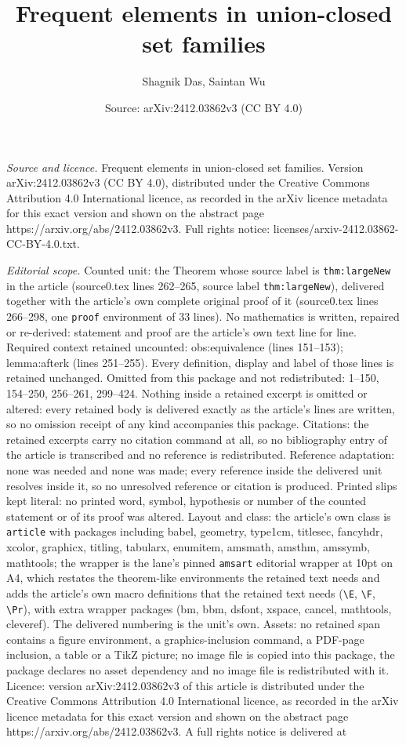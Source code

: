 \documentclass[10pt,a4paper]{amsart}
\title[Frequent elements in union-closed set families]{Frequent elements in union-closed set families}
\author{Shagnik Das, Saintan Wu}
\date{Source: arXiv:2412.03862v3 (CC BY 4.0)}
\begin{document}
\maketitle

\noindent\emph{Source and licence.} Frequent elements in union-closed set families. Version arXiv:2412.03862v3 (CC BY 4.0), distributed under the Creative Commons Attribution 4.0 International licence, as recorded in the arXiv licence metadata for this exact version and shown on the abstract page https://arxiv.org/abs/2412.03862v3. Full rights notice: licenses/arxiv-2412.03862-CC-BY-4.0.txt.\par\smallskip

\noindent\textit{Editorial scope.} Counted unit: the Theorem whose source label is \texttt{thm:largeNew} in the article (source0.tex lines 262--265, source label \texttt{thm:largeNew}), delivered together with the article's own complete original proof of it (source0.tex lines 266--298, one \texttt{proof} environment of 33 lines). No mathematics is written, repaired or re-derived: statement and proof are the article's own text line for line. Required context retained uncounted: obs:equivalence (lines 151--153); lemma:afterk (lines 251--255). Every definition, display and label of those lines is retained unchanged. Omitted from this package and not redistributed: 1--150, 154--250, 256--261, 299--424. Nothing inside a retained excerpt is omitted or altered: every retained body is delivered exactly as the article's lines are written, so no omission receipt of any kind accompanies this package. Citations: the retained excerpts carry no citation command at all, so no bibliography entry of the article is transcribed and no reference is redistributed. Reference adaptation: none was needed and none was made; every reference inside the delivered unit resolves inside it, so no unresolved reference or citation is produced. Printed slips kept literal: no printed word, symbol, hypothesis or number of the counted statement or of its proof was altered. Layout and class: the article's own class is \texttt{article} with packages including babel, geometry, type1cm, titlesec, fancyhdr, xcolor, graphicx, titling, tabularx, enumitem, amsmath, amsthm, amssymb, mathtools; the wrapper is the lane's pinned \texttt{amsart} editorial wrapper at 10pt on A4, which restates the theorem-like environments the retained text needs and adds the article's own macro definitions that the retained text needs (\texttt{\textbackslash E}, \texttt{\textbackslash F}, \texttt{\textbackslash Pr}), with extra wrapper packages (bm, bbm, dsfont, xspace, cancel, mathtools, cleveref). The delivered numbering is the unit's own. Assets: no retained span contains a figure environment, a graphics-inclusion command, a PDF-page inclusion, a table or a TikZ picture; no image file is copied into this package, the package declares no asset dependency and no image file is redistributed with it. Licence: version arXiv:2412.03862v3 of this article is distributed under the Creative Commons Attribution 4.0 International licence, as recorded in the arXiv licence metadata for this exact version and shown on the abstract page https://arxiv.org/abs/2412.03862v3. A full rights notice is delivered at 
\end{document}
